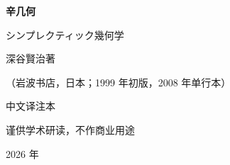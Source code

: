 \begin{titlepage}
\centering
\vspace*{3cm}
{\Huge\bfseries 辛\quad 几\quad 何\par}
\vspace{1.2cm}
{\Large シンプレクティック幾何学\par}
\vspace{2.4cm}
{\Large 深谷賢治\quad 著\par}
\vspace{0.6cm}
{\large （岩波书店，日本；1999 年初版，2008 年单行本）\par}
\vspace{2.6cm}
{\LARGE 中\quad 文\quad 译\quad 注\quad 本\par}
\vspace{1.0cm}
{\large 谨供学术研读，不作商业用途\par}
\vfill
{\large 2026 年\par}
\end{titlepage}
